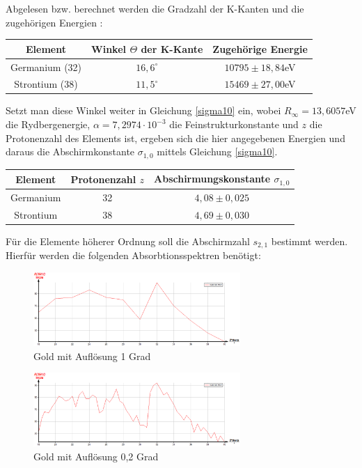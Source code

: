 Abgelesen bzw. berechnet werden die Gradzahl der K-Kanten und die zugehörigen Energien :
\begin{table}[H]
\begin{tabular}{|c|c|c|}
\hline 
Element & Winkel $\Theta$ der K-Kante & Zugehörige Energie \\ 
\hline 
Germanium (32) & $16,6^\circ$ & $10795\pm18,84$eV \\ 
\hline 
Strontium (38) & $11,5^\circ$ & $15469\pm27,00$eV \\ 
\hline 
\end{tabular} 
\end{table}

Setzt man diese Winkel weiter in Gleichung \eqref{sigma10} ein, wobei $R_\infty = 13,6057$eV die Rydbergenergie, $\alpha = 7,2974 \cdot 10^{-3}$ die Feinstrukturkonstante und $z$ die Protonenzahl des Elements ist, ergeben sich die hier angegebenen Energien und daraus die Abschirmkonstante $\sigma_{1,0}$ mittels Gleichung \eqref{sigma10}.
\begin{table}[H]
\begin{tabular}{|c|c|c|}
\hline 
Element & Protonenzahl $z$ & Abschirmungskonstante $\sigma_{1,0}$ \\ 
\hline 
Germanium & 32 & $4,08\pm0,025$ \\ 
\hline 
Strontium & 38 & $4,69\pm0,030$ \\ 
\hline 
\end{tabular}
\end{table}
Für die Elemente höherer Ordnung soll die Abschirmzahl $s_{2,1}$ bestimmt werden. Hierfür werden die folgenden Absorbtionsspektren benötigt:

\begin{figure}[H]
\includegraphics[width=0.7\textwidth] {pics/gold01.png}
\centering
\caption{Gold mit Auflösung 1 Grad}
\label{gold1}
\end{figure}

\begin{figure}[H]
\includegraphics[width=0.7\textwidth] {pics/gold02.png}
\centering
\caption{Gold mit Auflösung 0,2 Grad}
\label{gold2}
\end{figure}

